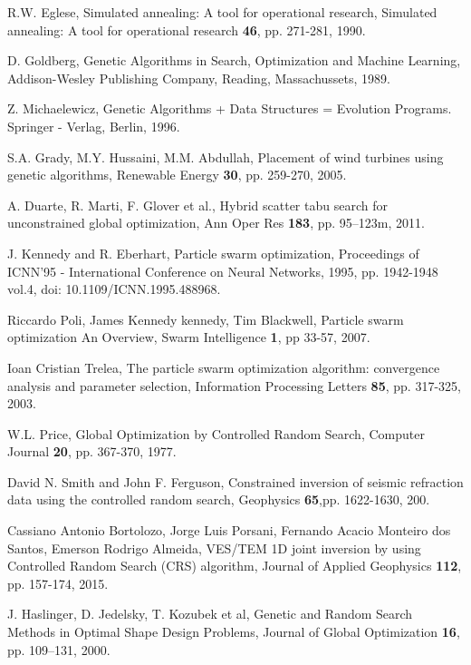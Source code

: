 \documentclass[symmetry,article,submit,moreauthors,pdftex]{mdpi}
\begin{document}
\begin{thebibliography}{10}
R.W. Eglese, Simulated annealing: A tool for operational
research, Simulated annealing: A tool for operational research \textbf{46},
pp. 271-281, 1990.

D. Goldberg, Genetic Algorithms in Search, Optimization
and Machine Learning, Addison-Wesley Publishing Company, Reading,
Massachussets, 1989.

Z. Michaelewicz, Genetic Algorithms + Data Structures
= Evolution Programs. Springer - Verlag, Berlin, 1996.

S.A. Grady, M.Y. Hussaini, M.M. Abdullah, Placement
of wind turbines using genetic algorithms, Renewable Energy \textbf{30},
pp. 259-270, 2005.

A. Duarte, R. Marti, F. Glover et al., Hybrid scatter
tabu search for unconstrained global optimization, Ann Oper Res \textbf{183},
pp. 95--123m, 2011.

J. Kennedy and R. Eberhart, \textquotedbl Particle
swarm optimization,\textquotedbl{} Proceedings of ICNN'95 - International
Conference on Neural Networks, 1995, pp. 1942-1948 vol.4, doi: 10.1109/ICNN.1995.488968.

Riccardo Poli, James Kennedy kennedy, Tim Blackwell,
Particle swarm optimization An Overview, Swarm Intelligence \textbf{1},
pp 33-57, 2007. 

Ioan Cristian Trelea, The particle swarm optimization
algorithm: convergence analysis and parameter selection, Information
Processing Letters \textbf{85}, pp. 317-325, 2003.

W.L. Price, Global Optimization by Controlled Random
Search, Computer Journal \textbf{ 20}, pp. 367-370, 1977.

David N. Smith and John F. Ferguson, Constrained
inversion of seismic refraction data using the controlled random search,
Geophysics \textbf{65},pp. 1622-1630, 200.

Cassiano Antonio Bortolozo, Jorge Luis Porsani,
Fernando Acacio Monteiro dos Santos, Emerson Rodrigo Almeida, VES/TEM
1D joint inversion by using Controlled Random Search (CRS) algorithm,
Journal of Applied Geophysics \textbf{112}, pp. 157-174, 2015.

J. Haslinger, D. Jedelsky, T. Kozubek
et al, Genetic and Random Search Methods in Optimal Shape Design Problems,
Journal of Global Optimization \textbf{16}, pp. 109--131, 2000.


\end{thebibliography}
\end{document}
